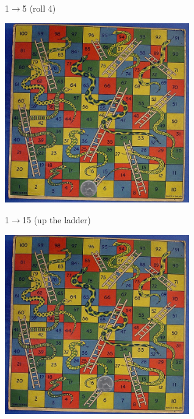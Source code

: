 \documentclass{beamer}
\begin{document}
\begin{frame}{1$\rightarrow$5 (roll 4)}
  \begin{center}
    \includegraphics[width=8cm]{game5.jpg}
  \end{center}
    \vfill
\tiny{}
\end{frame}


\begin{frame}{1$\rightarrow$15 (up the ladder)}
  \begin{center}
    \includegraphics[width=8cm]{game15.jpg}
  \end{center}
    \vfill
\tiny{}
\end{frame}
\end{document}
